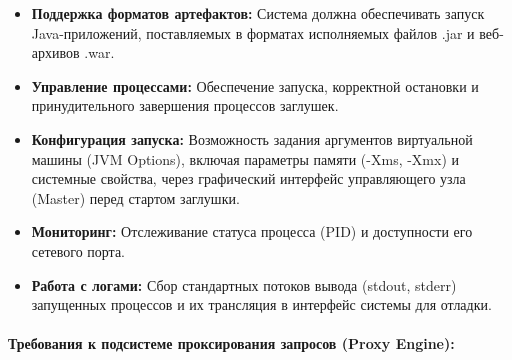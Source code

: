 \documentclass[
]{article}
\begin{document}
\begin{itemize}
\item
  \textbf{Поддержка форматов артефактов:} Система должна обеспечивать
  запуск Java-приложений, поставляемых в форматах исполняемых файлов
  .jar и веб-архивов .war.
\item
  \textbf{Управление процессами:} Обеспечение запуска, корректной
  остановки и принудительного завершения процессов заглушек.
\item
  \textbf{Конфигурация запуска:} Возможность задания аргументов
  виртуальной машины (JVM Options), включая параметры памяти (-Xms,
  -Xmx) и системные свойства, через графический интерфейс управляющего
  узла (Master) перед стартом заглушки.
\item
  \textbf{Мониторинг:} Отслеживание статуса процесса (PID) и доступности
  его сетевого порта.
\item
  \textbf{Работа с логами:} Сбор стандартных потоков вывода (stdout,
  stderr) запущенных процессов и их трансляция в интерфейс системы для
  отладки.
\end{itemize}

\paragraph{Требования к подсистеме проксирования запросов (Proxy
Engine):}\label{ux442ux440ux435ux431ux43eux432ux430ux43dux438ux44f-ux43a-ux43fux43eux434ux441ux438ux441ux442ux435ux43cux435-ux43fux440ux43eux43aux441ux438ux440ux43eux432ux430ux43dux438ux44f-ux437ux430ux43fux440ux43eux441ux43eux432-proxy-engine}
\end{document}
